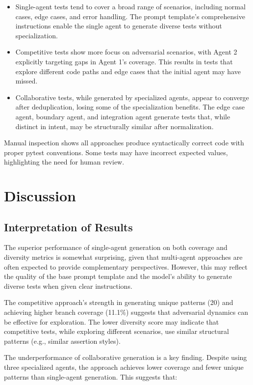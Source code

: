 \documentclass[11pt]{article}
\begin{document}
\begin{itemize}
\item Single-agent tests tend to cover a broad range of scenarios, including normal cases, edge cases, and error handling. The prompt template's comprehensive instructions enable the single agent to generate diverse tests without specialization.
\item Competitive tests show more focus on adversarial scenarios, with Agent 2 explicitly targeting gaps in Agent 1's coverage. This results in tests that explore different code paths and edge cases that the initial agent may have missed.
\item Collaborative tests, while generated by specialized agents, appear to converge after deduplication, losing some of the specialization benefits. The edge case agent, boundary agent, and integration agent generate tests that, while distinct in intent, may be structurally similar after normalization.
\end{itemize}

Manual inspection shows all approaches produce syntactically correct code with proper pytest conventions. Some tests may have incorrect expected values, highlighting the need for human review.

\section{Discussion}
\label{sec:discussion}

\subsection{Interpretation of Results}

The superior performance of single-agent generation on both coverage and diversity metrics is somewhat surprising, given that multi-agent approaches are often expected to provide complementary perspectives. However, this may reflect the quality of the base prompt template and the model's ability to generate diverse tests when given clear instructions.

The competitive approach's strength in generating unique patterns (20) and achieving higher branch coverage (11.1\%) suggests that adversarial dynamics can be effective for exploration. The lower diversity score may indicate that competitive tests, while exploring different scenarios, use similar structural patterns (e.g., similar assertion styles).

The underperformance of collaborative generation is a key finding. Despite using three specialized agents, the approach achieves lower coverage and fewer unique patterns than single-agent generation. This suggests that:
\end{document}
